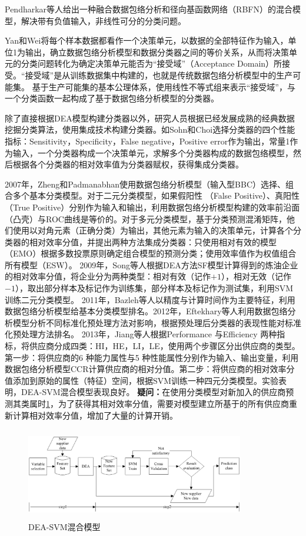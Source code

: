 Pendharkar等人\cite{pendharkar2011hybrid}给出一种融合数据包络分析和径向基函数网络（RBFN）的混合模型，解决带有负值输入，非线性可分的分类问题。

Yan和Wei\cite{yan2011dea}将每个样本数据都看作一个决策单元，以数据的全部特征作为输入，单位1为输出，确立数据包络分析模型和数据分类器之间的等价关系，从而将决策单元的分类问题转化为确定决策单元能否为“接受域”（Acceptance Domain）所接受。“接受域”是从训练数据集中构建的，也就是传统数据包络分析模型中的生产可能集。\cite{yan2011dea} 基于生产可能集的基本公理体系，使用线性不等式组来表示“接受域”，与一个分类函数一起构成了基于数据包络分析模型的分类器。

除了直接根据DEA模型构建分类器以外，研究人员根据已经发展成熟的经典数据挖掘分类算法，使用集成技术构建分类器。如Sohn和Choi\cite{sohn2001ensemble}选择分类器的四个性能指标：Sensitivity，Specificity，False negative，Positive error作为输出，常量1作为输入，一个分类器构成一个决策单元，求解多个分类器构成的数据包络模型，然后根据各个分类器的相对效率值为分类器赋权，获得集成分类器。

2007年，Zheng和Padmanabhan\cite{zheng2007constructing}使用数据包络分析模型（输入型BBC）选择、组合多个基本分类模型。对于二元分类模型，如果假阳性
（False Positive）、真阳性（True Positive）分别作为输入和输出，利用数据包络分析模型构建的效率前沿面（凸壳）与ROC曲线是等价的。对于多元分类模型，基于分类预测混淆矩阵，他们使用以对角元素（正确分类）为输出，其他元素为输入的决策单元，计算各个分类器的相对效率分值，并提出两种方法集成分类器：只使用相对有效的模型（EMO）根据多数投票原则确定组合模型的预测分类；使用效率值作为权值组合所有模型（ESW）。
2009年，Song等人\cite{song2009oil}根据DEA方法SF模型计算得到的炼油企业的相对效率分值，将企业分为两种类型：相对有效（记作$+1$），相对无效（记作$-1$），取出部分样本及标记作为训练集，部分样本及标记作为测试集，利用SVM训练二元分类模型。
2011年，Bazleh等人\cite{bazleh2011new}以精度与计算时间作为主要特征，利用数据包络分析模型给基本分类模型排名。2012年，Eftekhary等人\cite{eftekhary2012ranking}利用数据包络分析模型分析不同标准化预处理方法对影响，根据预处理后分类器的表现性能对标准化预处理方法排名。
2013年，Jiang等人\cite{jiang2013supplier}根据Performance 与Efficiency 两种指标，将供应商分成四类：HI，HE，LI，LE，使用两个步骤区分出供应商的类型。第一步：将供应商的6 种能力属性与5 种性能属性分别作为输入、输出变量，利用数据包络分析模型CCR计算供应商的相对分值。第二步：将供应商的相对效率分值添加到原始的属性（特征）空间，根据SVM训练一种四元分类模型。实验表明，DEA-SVM混合模型表现良好。
\textbf{疑问：}\cite{jiang2013supplier}在使用分类模型对新加入的供应商预测其类属时\ref{fig:deasvm}，为了获得其相对效率分值，需要对模型建立所基于的所有供应商重新计算相对效率分值，增加了大量的计算开销。
\begin{figure}[ht]
  \centering
  \includegraphics[width=0.85\textwidth,height=4cm]{figures/deasvm.eps}
  \caption{DEA-SVM混合模型}\label{fig:deasvm}
\end{figure}

